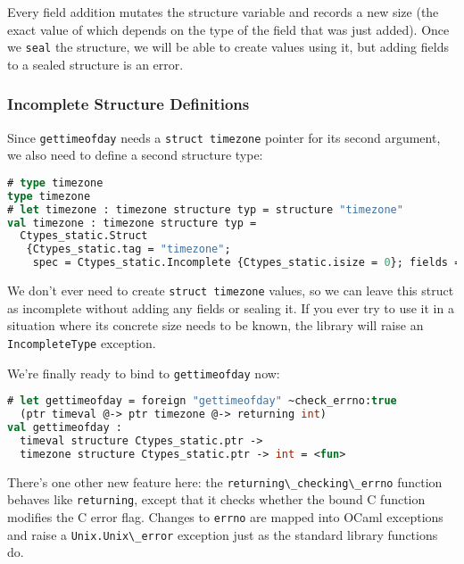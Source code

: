 Every field addition mutates the structure variable and records a new
size (the exact value of which depends on the type of the field that was
just added). Once we \passthrough{\lstinline!seal!} the structure, we
will be able to create values using it, but adding fields to a sealed
structure is an error.

\hypertarget{incomplete-structure-definitions}{%
\subsubsection{Incomplete Structure
Definitions}\label{incomplete-structure-definitions}}

Since \passthrough{\lstinline!gettimeofday!} needs a
\passthrough{\lstinline!struct timezone!} pointer for its second
argument, we also need to define a second structure type:

\begin{lstlisting}[language=Caml]
# type timezone
type timezone
# let timezone : timezone structure typ = structure "timezone"
val timezone : timezone structure typ =
  Ctypes_static.Struct
   {Ctypes_static.tag = "timezone";
    spec = Ctypes_static.Incomplete {Ctypes_static.isize = 0}; fields = []}
\end{lstlisting}

We don't ever need to create \passthrough{\lstinline!struct timezone!}
values, so we can leave this struct as incomplete without adding any
fields or sealing it. If you ever try to use it in a situation where its
concrete size needs to be known, the library will raise an
\passthrough{\lstinline!IncompleteType!} exception.

We're finally ready to bind to \passthrough{\lstinline!gettimeofday!}
now:

\begin{lstlisting}[language=Caml]
# let gettimeofday = foreign "gettimeofday" ~check_errno:true
  (ptr timeval @-> ptr timezone @-> returning int)
val gettimeofday :
  timeval structure Ctypes_static.ptr ->
  timezone structure Ctypes_static.ptr -> int = <fun>
\end{lstlisting}

There's one other new feature here: the
\passthrough{\lstinline!returning\_checking\_errno!} function behaves
like \passthrough{\lstinline!returning!}, except that it checks whether
the bound C function modifies the C error flag. Changes to
\passthrough{\lstinline!errno!} are mapped into OCaml exceptions and
raise a \passthrough{\lstinline!Unix.Unix\_error!} exception just as the
standard library functions do.

